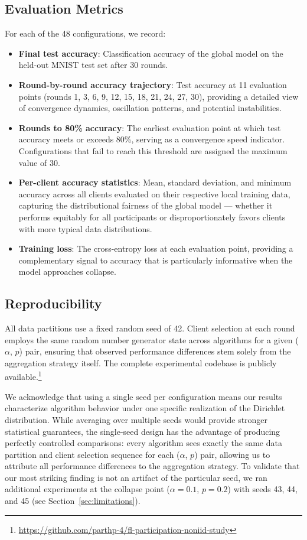 \documentclass[conference]{IEEEtran}
\begin{document}
\subsection{Evaluation Metrics}

For each of the 48 configurations, we record:
\begin{itemize}
    \item \textbf{Final test accuracy}: Classification accuracy of the global model on the held-out MNIST test set after 30 rounds.
    \item \textbf{Round-by-round accuracy trajectory}: Test accuracy at 11 evaluation points (rounds 1, 3, 6, 9, 12, 15, 18, 21, 24, 27, 30), providing a detailed view of convergence dynamics, oscillation patterns, and potential instabilities.
    \item \textbf{Rounds to 80\% accuracy}: The earliest evaluation point at which test accuracy meets or exceeds 80\%, serving as a convergence speed indicator. Configurations that fail to reach this threshold are assigned the maximum value of 30.
    \item \textbf{Per-client accuracy statistics}: Mean, standard deviation, and minimum accuracy across all clients evaluated on their respective local training data, capturing the distributional fairness of the global model --- whether it performs equitably for all participants or disproportionately favors clients with more typical data distributions.
    \item \textbf{Training loss}: The cross-entropy loss at each evaluation point, providing a complementary signal to accuracy that is particularly informative when the model approaches collapse.
\end{itemize}

\subsection{Reproducibility}

All data partitions use a fixed random seed of 42. Client selection at each round employs the same random number generator state across algorithms for a given ($\alpha$, $p$) pair, ensuring that observed performance differences stem solely from the aggregation strategy itself. The complete experimental codebase is publicly available.\footnote{\url{https://github.com/parthp-4/fl-participation-noniid-study}}

We acknowledge that using a single seed per configuration means our results characterize algorithm behavior under one specific realization of the Dirichlet distribution. While averaging over multiple seeds would provide stronger statistical guarantees, the single-seed design has the advantage of producing perfectly controlled comparisons: every algorithm sees exactly the same data partition and client selection sequence for each ($\alpha$, $p$) pair, allowing us to attribute all performance differences to the aggregation strategy. To validate that our most striking finding is not an artifact of the particular seed, we ran additional experiments at the collapse point ($\alpha = 0.1$, $p = 0.2$) with seeds 43, 44, and 45 (see Section~\ref{sec:limitations}).
\end{document}
